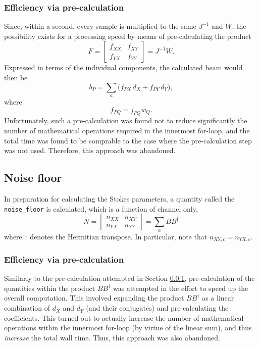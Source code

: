 \documentclass{article}
\begin{document}
\subsubsection{Efficiency via pre-calculation}
\label{sec:precalc1}
Since, within a second, every sample is multiplied to the same $J^{-1}$ and $W$, the possibility exists for a processing speed by means of pre-calculating the product
\begin{equation}
    F = \begin{bmatrix} f_{XX} & f_{XY} \\ f_{YX} & f_{YY} \end{bmatrix} = J^{-1} W.
\end{equation}
Expressed in terms of the individual components, the calculated beam would then be
\begin{equation}
    b_P = \sum_a \bigg(f_{PX} \, d_X + f_{PY} \, d_Y\bigg),
\end{equation}
where
\begin{equation}
    f_{PQ} = j_{PQ} w_Q.
\end{equation}
Unfortunately, such a pre-calculation was found not to reduce significantly the number of mathematical operations required in the innermost for-loop, and the total time was found to be comprable to the case where the pre-calculation step was not used.
Therefore, this approach was abandoned.

\subsection{Noise floor}
In preparation for calculating the Stokes parameters, a quantity called the \texttt{noise\_floor} is calculated, which is a function of channel only,
\begin{equation}
    N = \begin{bmatrix} n_{XX} & n_{XY} \\ n_{YX} & n_{YY} \end{bmatrix}
      = \sum_a BB^\dagger
\end{equation}
where $\dagger$ denotes the Hermitian transpose.
In particular, note that $n_{XY,c} = n_{YX,c}$.

\subsubsection{Efficiency via pre-calculation}
Similarly to the pre-calculation attempted in Section \ref{sec:precalc1}, pre-calculation of the quantities within the product $BB^\dagger$ was attempted in the effort to speed up the overall computation.
This involved expanding the product $BB^\dagger$ as a linear combination of $d_X$ and $d_Y$ (and their conjugates) and pre-calculating the coefficients.
This turned out to actually increase the number of mathematical operations within the innermost for-loop (by virtue of the linear sum), and thus \emph{increase} the total wall time.
Thus, this approach was also abandoned.
\end{document}
